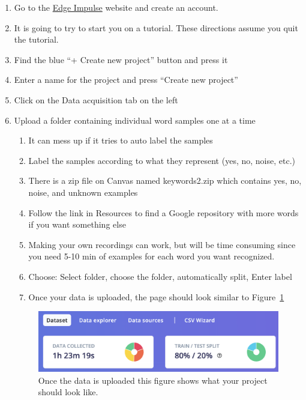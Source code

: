 \begin{enumerate}
  \item Go to the \href{https://edgeimpulse.com/}{Edge Impulse} website and create an 
account. 
  \item It is going to try to start you on a tutorial. These directions assume you quit 
      the tutorial.
  \item Find the blue ``+ Create new project'' button and press it 
  \item Enter a name for the project and press ``Create new project''
  \item Click on the Data acquisition tab on the left
  \item Upload a folder containing individual word samples one at a time
  \begin{enumerate}
    \item It can mess up if it tries to auto label the samples
    \item Label the samples according to what they represent (yes, no, noise, etc.)
    \item There is a zip file on Canvas named keywords2.zip which contains yes, no, noise, and unknown examples
    \item Follow the link in Resources to find a Google repository with more words if you want something else
    \item Making your own recordings can work, but will be time consuming since you need 5-10 min of examples 
            for each word you want recognized.
    \item Choose: Select folder, choose the folder, automatically split, Enter label
    \item Once your data is uploaded, the page should look similar to Figure~\ref{fig:edgeimpulsedata}
  \end{enumerate}

  \begin{figure}[!htb]
    \centering
    \includegraphics[scale=0.6]{machineLearning/data.png}
    \caption{Once the data is uploaded this figure shows what your project should look like.}
    \label{fig:edgeimpulsedata}
  \end{figure} 


\end{enumerate}
